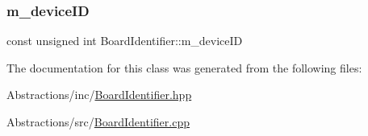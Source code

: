 \mbox{\label{class_board_identifier_ad7798603dc56380e884d075ba81495e1}} 
\subsubsection{\texorpdfstring{m\+\_\+device\+ID}{m\_deviceID}}
{\footnotesize\ttfamily const unsigned int Board\+Identifier\+::m\+\_\+device\+ID\hspace{0.3cm}{\ttfamily [protected]}}



The documentation for this class was generated from the following files\+:\begin{DoxyCompactItemize}
\item 
Abstractions/inc/\hyperlink{_board_identifier_8hpp}{Board\+Identifier.\+hpp}\item 
Abstractions/src/\hyperlink{_board_identifier_8cpp}{Board\+Identifier.\+cpp}\end{DoxyCompactItemize}
